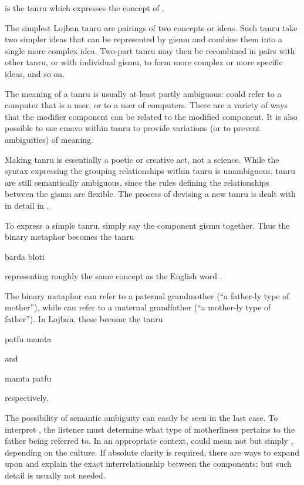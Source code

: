 {\noindent}is the tanru which expresses the concept of . 

The simplest Lojban tanru are pairings of two concepts or ideas. Such tanru take two simpler ideas that can be represented by gismu and combine them into a single more complex idea. Two-part tanru may then be recombined in pairs with other tanru, or with individual gismu, to form more complex or more specific ideas, and so on.

The meaning of a tanru is usually at least partly ambiguous:  could refer to a computer that is a user, or to a user of computers. There are a variety of ways that the modifier component can be related to the modified component. It is also possible to use cmavo within tanru to provide variations (or to prevent ambiguities) of meaning.

Making tanru is essentially a poetic or creative act, not a science. While the syntax expressing the grouping relationships within tanru is unambiguous, tanru are still semantically ambiguous, since the rules defining the relationships between the gismu are flexible. The process of devising a new tanru is dealt with in detail in .

To express a simple tanru, simply say the component gismu together. Thus the binary metaphor  becomes the tanru
\begin{example}
barda bloti
\end{example}

{\noindent}representing roughly the same concept as the English word . 

The binary metaphor  can refer to a paternal grandmother (``a father-ly type of mother''), while  can refer to a maternal grandfather (``a mother-ly type of father''). In Lojban, these become the tanru
\begin{example}
patfu mamta
\end{example}

{\noindent}and
\begin{example}
mamta patfu
\end{example}

{\noindent}respectively. 

The possibility of semantic ambiguity can easily be seen in the last case. To interpret , the listener must determine what type of motherliness pertains to the father being referred to. In an appropriate context,  could mean not  but simply , depending on the culture. If absolute clarity is required, there are ways to expand upon and explain the exact interrelationship between the components; but such detail is usually not needed.

